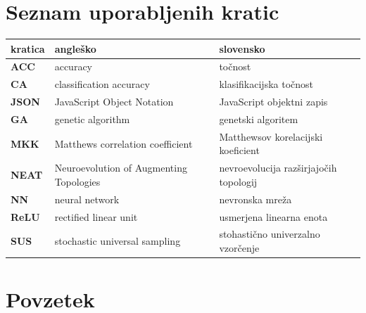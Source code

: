 \documentclass[a4paper,12pt,openright]{book}
\newcommand{\clearemptydoublepage}{\newpage{\pagestyle{empty}\cleardoublepage}}
\begin{document}
    \clearemptydoublepage


    \chapter*{Seznam uporabljenih kratic}

    \noindent\begin{tabular}{p{}|p{}|p{}}    %
                 \textbf{kratica} & \textbf{angleško}                       & \textbf{slovensko}                     \\ \hline
                 \textbf{ACC}     & accuracy                                & točnost                                \\
                 \textbf{CA}      & classification accuracy                 & klasifikacijska točnost                \\
                 \textbf{JSON}    & JavaScript Object Notation              & JavaScript objektni zapis              \\
                 \textbf{GA}      & genetic algorithm                       & genetski algoritem                     \\
                 \textbf{MKK}     & Matthews correlation coefficient        & Matthewsov korelacijski koeficient     \\
                 \textbf{NEAT}    & Neuroevolution of Augmenting Topologies & nevroevolucija razširjajočih topologij \\
                 \textbf{NN}      & neural network                          & nevronska mreža                        \\
                 \textbf{ReLU}    & rectified linear unit                   & usmerjena linearna enota               \\
                 \textbf{SUS}     & stochastic universal sampling           & stohastično univerzalno vzorčenje      \\
    \end{tabular}



    \clearemptydoublepage

    \chapter*{Povzetek}
\end{document}
